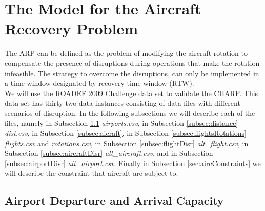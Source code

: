 \documentclass[ijoo,nonblindrev]{informs-ijoo}
\begin{document}
\section{The Model for the Aircraft Recovery Problem}\label{sec:modelARP}
The ARP can be defined as the problem of modifying the aircraft rotation to compensate the presence of disruptions during operations that make the rotation infeasible. The strategy to overcome the disruptions, can only be implemented in a time window designated by recovery time window (RTW).\\
	 We will use the ROADEF 2009 Challenge data set to validate the CHARP. This data set has thirty two data instances consisting of data files with different scenarios of disruption. In the following subsections we will describe each of the files, namely in Subsection  \ref{subsec:airports} \textit{airports.csv}, in Subsection \ref{subsec:distance} \textit{dist.csv}, in Subsection \ref{subsec:aicraft}, in Subsection \ref{subsec:flightsRotations} \textit{flights.csv} and \textit{rotations.csv}, in Subsection \ref{subsec:flightDisr} \textit{alt\_flight.csv}, in Subsection \ref{subsec:aircraftDisr} \textit{alt\_aircraft.csv}, and in Subsection \ref{subsec:airportDisr} \textit{alt\_airport.csv}. Finally in Subsection \ref{sec:aircConstraints} we will describe the constraint that aircraft are subject to.
	 




\subsection{Airport Departure and Arrival Capacity} \label{subsec:airports}
\end{document}
